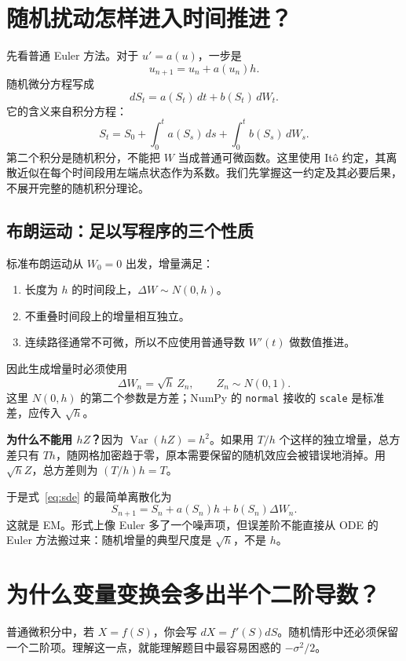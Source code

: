 \documentclass[11pt,a4paper,fontset=none]{ctexart}
\newcommand{\Var}{\operatorname{Var}}
\begin{document}
\newpage
\section{随机扰动怎样进入时间推进？}
先看普通 Euler 方法。对于 $u'=a(u)$，一步是
\[
u_{n+1}=u_n+a(u_n)h.
\]
随机微分方程写成
\begin{equation}\label{eq:sde}
dS_t=a(S_t)\,dt+b(S_t)\,dW_t.
\end{equation}
它的含义来自积分方程：
\[
S_t=S_0+\int_0^t a(S_s)\,ds+\int_0^t b(S_s)\,dW_s.
\]
第二个积分是随机积分，不能把 $W$ 当成普通可微函数。这里使用 It\^o 约定，其离散近似在每个时间段用左端点状态作为系数。我们先掌握这一约定及其必要后果，不展开完整的随机积分理论。

\subsection*{布朗运动：足以写程序的三个性质}
标准布朗运动从 $W_0=0$ 出发，增量满足：
\begin{enumerate}
\item 长度为 $h$ 的时间段上，$\Delta W\sim N(0,h)$。
\item 不重叠时间段上的增量相互独立。
\item 连续路径通常不可微，所以不应使用普通导数 $W'(t)$ 做数值推进。
\end{enumerate}
因此生成增量时必须使用
\begin{equation}\label{eq:increment}
\Delta W_n=\sqrt h\,Z_n,\qquad Z_n\sim N(0,1).
\end{equation}
这里 $N(0,h)$ 的第二个参数是方差；NumPy 的 \texttt{normal} 接收的 \texttt{scale} 是标准差，应传入 $\sqrt h$。

\textbf{为什么不能用 $hZ$？}因为 $\Var(hZ)=h^2$。如果用 $T/h$ 个这样的独立增量，总方差只有 $Th$，随网格加密趋于零，原本需要保留的随机效应会被错误地消掉。用 $\sqrt h Z$，总方差则为 $(T/h)h=T$。

于是式~\eqref{eq:sde} 的最简单离散化为
\begin{equation}\label{eq:em-general}
S_{n+1}=S_n+a(S_n)h+b(S_n)\Delta W_n.
\end{equation}
这就是 EM。形式上像 Euler 多了一个噪声项，但误差阶不能直接从 ODE 的 Euler 方法搬过来：随机增量的典型尺度是 $\sqrt h$，不是 $h$。

\newpage
\section{为什么变量变换会多出半个二阶导数？}\label{sec:ito}
普通微积分中，若 $X=f(S)$，你会写 $dX=f'(S)dS$。随机情形中还必须保留一个二阶项。理解这一点，就能理解题目中最容易困惑的 $-\sigma^2/2$。
\end{document}
